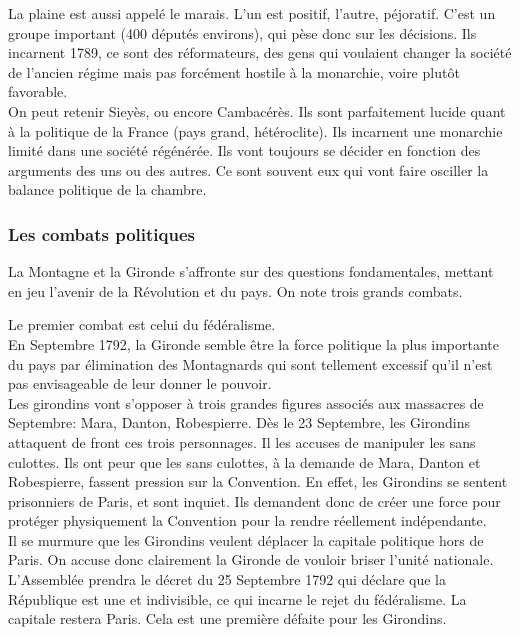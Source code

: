 \documentclass[10pt, a4paper, openany]{book}
\begin{document}
La plaine est aussi appelé le marais. L'un est positif, l'autre, péjoratif. C'est un groupe important (400 députés environs), qui pèse donc sur les décisions. Ils incarnent 1789, ce sont des réformateurs, des gens qui voulaient changer la société de l'ancien régime mais pas forcément hostile à la monarchie, voire plutôt favorable. \\
On peut retenir Sieyès, ou encore Cambacérès. Ils sont parfaitement lucide quant à la politique de la France (pays grand, hétéroclite). Ils incarnent une monarchie limité dans une société régénérée. Ils vont toujours se décider en fonction des arguments des uns ou des autres. Ce sont souvent eux qui vont faire osciller la balance politique de la chambre. 

\subsubsection{Les combats politiques}

La Montagne et la Gironde s'affronte sur des questions fondamentales, mettant en jeu l'avenir de la Révolution et du pays. On note trois grands combats.


Le premier combat est celui du fédéralisme. \\
En Septembre 1792, la Gironde semble être la force politique la plus importante du pays par élimination des Montagnards qui sont tellement excessif qu'il n'est pas envisageable de leur donner le pouvoir. \\
Les girondins vont s'opposer à trois grandes figures associés aux massacres de Septembre: Mara, Danton, Robespierre. Dès le 23 Septembre, les Girondins attaquent de front ces trois personnages. Il les accuses de manipuler les sans culottes. Ils ont peur que les sans culottes, à la demande de Mara, Danton et Robespierre, fassent pression sur la Convention. En effet, les Girondins se sentent prisonniers de Paris, et sont inquiet. Ils demandent donc de créer une force pour protéger physiquement la Convention pour la rendre réellement indépendante. \\
Il se murmure que les Girondins veulent déplacer la capitale politique hors de Paris. On accuse donc clairement la Gironde de vouloir briser l'unité nationale. \\
L'Assemblée prendra le décret du 25 Septembre 1792 qui déclare que la République est une et indivisible, ce qui incarne le rejet du fédéralisme. La capitale restera Paris. Cela est une première défaite pour les Girondins. 
\end{document}
